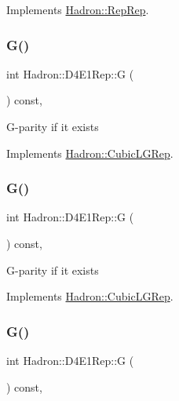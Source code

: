 Implements \mbox{\hyperlink{structHadron_1_1RepRep_a92c8802e5ed7afd7da43ccfd5b7cd92b}{Hadron\+::\+Rep\+Rep}}.

\mbox{\label{structHadron_1_1D4E1Rep_a3fe4ce9de97d3cece000be10562653f7}} 
\subsubsection{\texorpdfstring{G()}{G()}\hspace{0.1cm}{\footnotesize\ttfamily [1/3]}}
{\footnotesize\ttfamily int Hadron\+::\+D4\+E1\+Rep\+::G (\begin{DoxyParamCaption}{ }\end{DoxyParamCaption}) const\hspace{0.3cm}{\ttfamily [inline]}, {\ttfamily [virtual]}}

G-\/parity if it exists 

Implements \mbox{\hyperlink{structHadron_1_1CubicLGRep_ace26f7b2d55e3a668a14cb9026da5231}{Hadron\+::\+Cubic\+L\+G\+Rep}}.

\mbox{\label{structHadron_1_1D4E1Rep_a3fe4ce9de97d3cece000be10562653f7}} 
\subsubsection{\texorpdfstring{G()}{G()}\hspace{0.1cm}{\footnotesize\ttfamily [2/3]}}
{\footnotesize\ttfamily int Hadron\+::\+D4\+E1\+Rep\+::G (\begin{DoxyParamCaption}{ }\end{DoxyParamCaption}) const\hspace{0.3cm}{\ttfamily [inline]}, {\ttfamily [virtual]}}

G-\/parity if it exists 

Implements \mbox{\hyperlink{structHadron_1_1CubicLGRep_ace26f7b2d55e3a668a14cb9026da5231}{Hadron\+::\+Cubic\+L\+G\+Rep}}.

\mbox{\label{structHadron_1_1D4E1Rep_a3fe4ce9de97d3cece000be10562653f7}} 
\subsubsection{\texorpdfstring{G()}{G()}\hspace{0.1cm}{\footnotesize\ttfamily [3/3]}}
{\footnotesize\ttfamily int Hadron\+::\+D4\+E1\+Rep\+::G (\begin{DoxyParamCaption}{ }\end{DoxyParamCaption}) const\hspace{0.3cm}{\ttfamily [inline]}, {\ttfamily [virtual]}}

